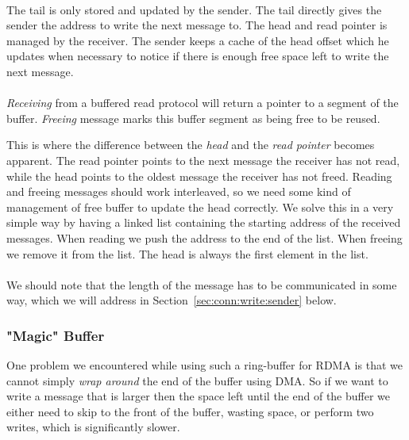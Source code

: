 \paragraph{} The tail is only stored and updated by the sender. The tail directly gives the sender the address to write the 
next message to. The head and read pointer is managed by the receiver. The sender keeps a cache of the head offset which he
updates when necessary to notice if there is enough free space left to write the next message.

\paragraph{}\emph{Receiving} from a buffered read protocol will 
return a pointer to a segment of the buffer. \emph{Freeing} message marks this buffer segment as being free to be reused.

This is where the difference between the \emph{head} and the \emph{read pointer} becomes apparent. The read pointer points 
to the next message the receiver has not read, while the head points to the oldest message the receiver has not freed. Reading
and freeing messages should work interleaved, so we need some kind of management of free buffer to update the head 
correctly. We solve this in a very simple way by having a linked list containing the starting address of the received messages.
When reading we push the address to the end of the list. When freeing we remove it from the list. The head is always the first 
element in the list.

\paragraph{}We should note that the length of the message has to be communicated in some way, which we will address in  
Section~\ref{sec:conn:write:sender} below.





\subsubsection{"Magic" Buffer} 

One problem we encountered while using such a ring-buffer for RDMA is that we cannot simply 
\emph{wrap around} the end of the buffer using DMA. So if we want to write a message that is larger then the space left until
the end of the buffer we either need to skip to the front of the buffer, wasting space, or perform two writes, which is 
significantly slower.

